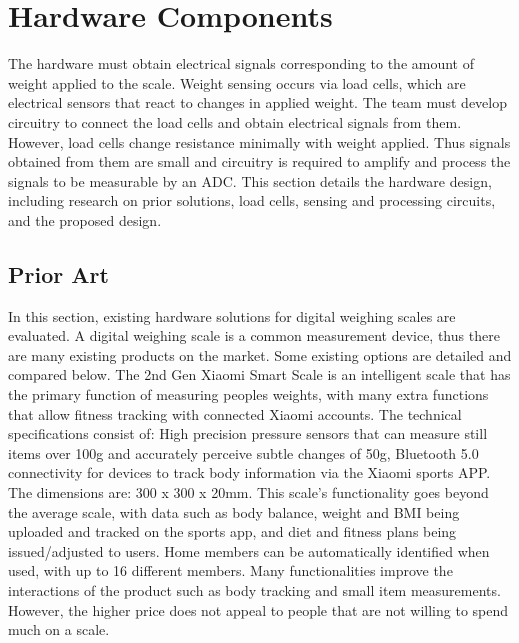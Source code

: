 
\chapter{Hardware Components}

The hardware must obtain electrical signals corresponding to the amount of weight applied to the scale. Weight sensing occurs via load cells, which are electrical sensors that react to changes in applied weight. The team must develop circuitry to connect the load cells and obtain electrical signals from them. However, load cells change resistance minimally with weight applied. Thus signals obtained from them are small and circuitry is required to amplify and process the signals to be measurable by an ADC. This section details the hardware design, including research on prior solutions, load cells, sensing and processing circuits, and the proposed design.

\section{Prior Art}

In this section, existing hardware solutions for digital weighing scales are evaluated. A digital weighing scale is a common measurement device, thus there are many existing products on the market. Some existing options are detailed and compared below.
The 2nd Gen Xiaomi Smart Scale is an intelligent scale that has the primary function of measuring peoples weights, with many extra functions that allow fitness tracking with connected Xiaomi accounts. The technical specifications consist of: High precision pressure sensors that can measure still items over 100g and accurately perceive subtle changes of 50g, Bluetooth 5.0 connectivity for devices to track body information via the Xiaomi sports APP. The dimensions are: 300 x 300 x 20mm. This scale’s functionality goes beyond the average scale, with data such as body balance, weight and BMI being uploaded and tracked on the sports app, and diet and fitness plans being issued/adjusted to users. Home members can be automatically identified when used, with up to 16 different members. Many functionalities improve the interactions of the product such as body tracking and small item measurements. However, the higher price does not appeal to people that are not willing to spend much on a scale.

